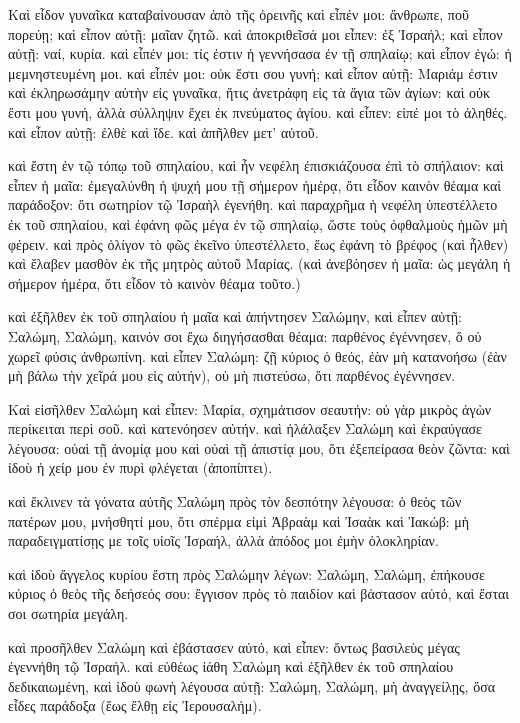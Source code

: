 \pend\pstart
{}

\pend\pstart
Καὶ εἶδον γυναῖκα καταβαίνουσαν ἀπὸ τῆς ὀρεινῆς καὶ εἶπέν μοι: ἄνθρωπε, ποῦ πορεύῃ; καὶ εἶπον αὐτῇ: μαῖαν ζητῶ. καὶ ἀποκριθεῖσά μοι εἶπεν: ἐξ Ἰσραήλ; καὶ εἶπον αὐτῇ: ναί, κυρία. καὶ εἶπέν μοι: τίς ἐστιν ἡ γεννήσασα ἐν τῇ σπηλαίῳ; καὶ εἶπον ἐγώ: ἡ μεμνηστευμένη μοι. καὶ εἶπέν μοι: οὐκ ἔστι σου γυνή; καὶ εἶπον αὐτῇ: Μαριάμ ἐστιν καὶ ἐκληρωσάμην αὐτὴν εἰς γυναῖκα, ἥτις ἀνετράφη εἰς τὰ ἅγια τῶν ἁγίων: καὶ οὐκ ἔστι μου γυνή, ἀλλὰ σύλληψιν ἔχει ἐκ πνεύματος ἁγίου. καὶ εἶπεν: εἰπέ μοι τὸ ἀληθές. καὶ εἶπον αὐτῇ: ἐλθὲ καὶ ἴδε. καὶ ἀπῆλθεν μετ' αὐτοῦ.

\pend\pstart
καὶ ἔστη ἐν τῷ τόπῳ τοῦ σπηλαίου, καὶ ἦν νεφέλη ἐπισκιάζουσα ἐπὶ τὸ σπήλαιον: καὶ εἶπεν ἡ μαῖα: ἐμεγαλύνθη ἡ ψυχή μου τῇ σήμερον ἡμέρᾳ, ὅτι εἶδον καινὸν θέαμα καὶ παράδοξον: ὅτι σωτηρίον τῷ Ἰσραὴλ ἐγενήθη. καὶ παραχρῆμα ἡ νεφέλη ὑπεστέλλετο ἐκ τοῦ σπηλαίου, καὶ ἐφάνη φῶς μέγα ἐν τῷ σπηλαίῳ, ὥστε τοὺς ὀφθαλμοὺς ἡμῶν μὴ φέρειν. καὶ πρὸς ὀλίγον τὸ φῶς ἐκεῖνο ὑπεστέλλετο, ἕως ἐφάνη τὸ βρέφος (καὶ ἦλθεν) καὶ ἔλαβεν μασθὸν ἐκ τῆς μητρὸς αὐτοῦ Μαρίας. (καὶ ἀνεβόησεν ἡ μαῖα: ὡς μεγάλη ἡ σήμερον ἡμέρα, ὅτι εἶδον τὸ καινὸν θέαμα τοῦτο.)

\pend\pstart
καὶ ἐξῆλθεν ἐκ τοῦ σπηλαίου ἡ μαῖα καὶ ἀπήντησεν Σαλώμην, καὶ εἶπεν αὐτῇ: Σαλώμη, Σαλώμη, καινόν σοι ἔχω διηγήσασθαι θέαμα: παρθένος ἐγέννησεν, ὅ οὐ χωρεῖ φύσις ἀνθρωπίνη. καὶ εἶπεν Σαλώμη: ζῇ κύριος ὁ θεός, ἐὰν μὴ κατανοήσω (ἐὰν μὴ βάλω τὴν χεῖρά μου εἰς αὐτήν), οὐ μὴ πιστεύσω, ὅτι παρθένος ἐγέννησεν.

\pend\pstart
{}

\pend\pstart
Καὶ εἰσῆλθεν Σαλώμη καὶ εἶπεν: Μαρία, σχημάτισον σεαυτήν: οὐ γὰρ μικρὸς ἀγὼν περίκειται περὶ σοῦ. καὶ κατενόησεν αὐτήν. καὶ ἠλάλαξεν Σαλώμη καὶ ἐκραύγασε λέγουσα: οὐαὶ τῇ ἀνομίᾳ μου καὶ οὐαὶ τῇ ἀπιστίᾳ μου, ὅτι ἐξεπείρασα θεὸν ζῶντα: καὶ ἰδοὺ ἡ χείρ μου ἐν πυρὶ φλέγεται (ἀποπίπτει).

\pend\pstart
καὶ ἔκλινεν τὰ γόνατα αὐτῆς Σαλώμη πρὸς τὸν δεσπότην λέγουσα: ὁ θεὸς τῶν πατέρων μου, μνήσθητί μου, ὅτι σπέρμα εἰμὶ Ἀβραὰμ καὶ Ἰσαὰκ καὶ Ἰακώβ: μὴ παραδειγματίσῃς με τοῖς υἱοῖς Ἰσραήλ, ἀλλὰ ἀπόδος μοι ἐμὴν ὁλοκληρίαν.

\pend\pstart
καὶ ἰδοὺ ἄγγελος κυρίου ἔστη πρὸς Σαλώμην λέγων: Σαλώμη, Σαλώμη, ἐπήκουσε κύριος ὁ θεὸς τῆς δεήσεός σου: ἔγγισον πρὸς τὸ παιδίον καὶ βάστασον αὐτό, καὶ ἔσται σοι σωτηρία μεγάλη.

\pend\pstart
καὶ προσῆλθεν Σαλώμη καὶ ἐβάστασεν αὐτό, καὶ εἶπεν: ὄντως βασιλεὺς μέγας ἐγεννήθη τῷ Ἰσραήλ. καὶ εὐθέως ἰάθη Σαλώμη καὶ ἐξῆλθεν ἐκ τοῦ σπηλαίου δεδικαιωμένη, καὶ ἰδοὺ φωνὴ λέγουσα αὐτῇ: Σαλώμη, Σαλώμη, μὴ ἀναγγείλῃς, ὅσα εἶδες παράδοξα (ἕως ἔλθῃ εἰς Ἰερουσαλήμ).

